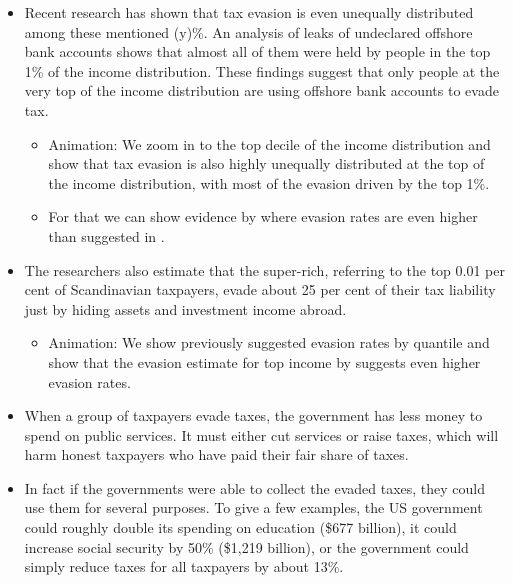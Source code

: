 \documentclass[11pt]{article}
\begin{document}
\begin{itemize}
    \begin{itemize}
        \item Animation: We show how tax evasion is distributed along the income distribution and show how much each percentile contributes to the "tax evasion pie". 
        \item Here we could use examples of \cite{johns2010distribution}, which show evasion rates along the income distribution for deciles and quantiles.
    \end{itemize}  
    \item Recent research has shown that tax evasion is even unequally distributed among these mentioned (y)\%. An analysis of leaks of undeclared offshore bank accounts shows that almost all of them were held by people in the top 1\% of the income distribution. These findings suggest that only people at the very top of the income distribution are using offshore bank accounts to evade tax.
    \begin{itemize}
        \item Animation: We zoom in to the top decile of the income distribution and show that tax evasion is also highly unequally distributed at the top of the income distribution, with most of the evasion driven by the top 1\%.
        \item For that we can show evidence by \cite{alstadsaeter2019tax} where evasion rates are even higher than suggested in \cite{johns2010distribution}. 
    \end{itemize} 
\item The researchers also estimate that the super-rich, referring to the top 0.01 per cent of Scandinavian taxpayers, evade about 25 per cent of their tax liability just by hiding assets and investment income abroad. 
\begin{itemize}
    \item Animation: We show previously suggested evasion rates by quantile and show that the evasion estimate for top income by \cite{alstadsaeter2019tax} suggests even higher evasion rates. 
\end{itemize}
\item When a group of taxpayers evade taxes, the government has less money to spend on public services. It must either cut services or raise taxes, which will harm honest taxpayers who have paid their fair share of taxes. 
\item In fact if the governments were able to collect the evaded taxes, they could use them for several purposes. To give a few examples, the US government could roughly double its spending on education (\$677 billion), it could increase social security by 50\% (\$1,219 billion), or the government could simply reduce taxes for all taxpayers by about 13\%.

\end{itemize}
\end{document}
